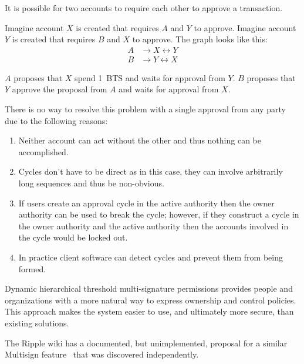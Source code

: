 
It is possible for two accounts to require each other to approve a transaction.

Imagine account $X$ is created that requires $A$ and $Y$ to approve.
Imagine account $Y$ is created that requires $B$ and $X$ to approve.
The graph looks like this:
\begin{align}
 A &\rightarrow X \leftrightarrow Y\\
 B &\rightarrow Y \leftrightarrow X
\end{align}

$A$ proposes that $X$ spend \SI{1}{BTS} and waits for approval from $Y$.
$B$ proposes that $Y$ approve the proposal from $A$ and waits for approval from $X$.

There is no way to resolve this problem with a single approval from any party
due to the following reasons:

\begin{enumerate}
 \item Neither account can act without the other and thus nothing can be
       accomplished.
 \item Cycles don't have to be direct as in this case, they can involve
       arbitrarily long sequences and thus be non-obvious.
 \item If users create an approval cycle in the active authority then the
       owner authority can be used to break the cycle; however, if they construct a
       cycle in the owner authority and the active authority then the accounts
       involved in the cycle would be locked out.
 \item In practice client software can detect cycles and prevent them from
       being formed.
\end{enumerate}


Dynamic hierarchical threshold multi-signature permissions provides people and
organizations with a more natural way to express ownership and control
policies. This approach makes the system easier to use, and ultimately more
secure, than existing solutions.


The Ripple wiki has a documented, but unimplemented, proposal for a similar
Multisign feature~\cite{ripple:multisig} that was discovered independently.
